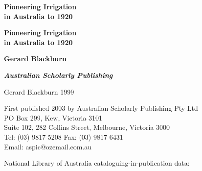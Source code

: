 \documentclass[11pt,b5paper,titlepage]{book}
\newcommand{\clearemptydoublepage}{\newpage{\pagestyle{empty}\cleardoublepage}}
\begin{document}


\frontmatter

\begin{titlepage}
\pagestyle{empty}

\begin{center}

\vspace*{60mm}


{\bfseries\sffamily\Huge Pioneering Irrigation \\[0.5ex]
in Australia to 1920}

\end{center}
\clearemptydoublepage

\begin{center}
\vspace*{30mm}

{\bfseries\sffamily\Huge Pioneering Irrigation \\[0.5ex]
in Australia to 1920}

\vspace{30mm}
{\bfseries\sffamily\huge Gerard Blackburn}

\vspace*{\fill}
{\bfseries\sffamily\slshape\Large Australian Scholarly Publishing}
\end{center}
\newpage


\begin{raggedright}

\vspace*{15ex}

 Gerard Blackburn 1999

\medskip
First published 2003 by Australian Scholarly Publishing Pty Ltd\\
PO Box 299, Kew, Victoria 3101\\
Suite 102, 282 Collins Street, Melbourne, Victoria 3000\\
Tel: (03) 9817 5208 \quad Fax: (03) 9817 6431\\
Email: aspic@ozemail.com.au


\bigskip
National Library of Australia cataloguing-in-publication data:\\


\end{raggedright}
\end{titlepage}
\end{document}
